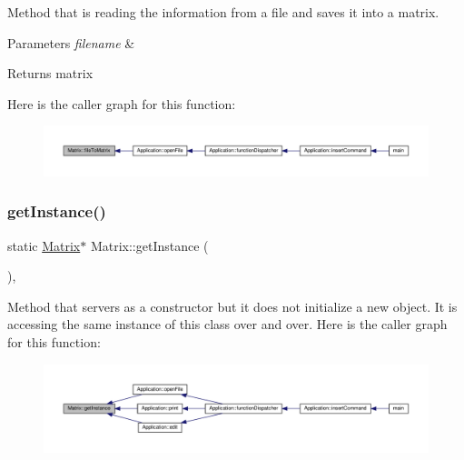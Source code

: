 Method that is reading the information from a file and saves it into a matrix. 
\begin{DoxyParams}{Parameters}
{\em filename} & \\
\hline
\end{DoxyParams}
\begin{DoxyReturn}{Returns}
matrix 
\end{DoxyReturn}
Here is the caller graph for this function\+:\nopagebreak
\begin{figure}[H]
\begin{center}
\leavevmode
\includegraphics[width=350pt]{class_matrix_a35eb9dcb01c552fea1f5926db35339ef_icgraph}
\end{center}
\end{figure}
\mbox{\label{class_matrix_a0c8e09a50ddb4d068d39456ea130abcc}} 
\subsubsection{\texorpdfstring{get\+Instance()}{getInstance()}}
{\footnotesize\ttfamily static \hyperlink{class_matrix}{Matrix}$\ast$ Matrix\+::get\+Instance (\begin{DoxyParamCaption}{ }\end{DoxyParamCaption})\hspace{0.3cm}{\ttfamily [inline]}, {\ttfamily [static]}}

Method that servers as a constructor but it does not initialize a new object. It is accessing the same instance of this class over and over. Here is the caller graph for this function\+:\nopagebreak
\begin{figure}[H]
\begin{center}
\leavevmode
\includegraphics[width=350pt]{class_matrix_a0c8e09a50ddb4d068d39456ea130abcc_icgraph}
\end{center}
\end{figure}
\mbox{\label{class_matrix_a52d82641f52304c9b6525747cd7f960c}} 
